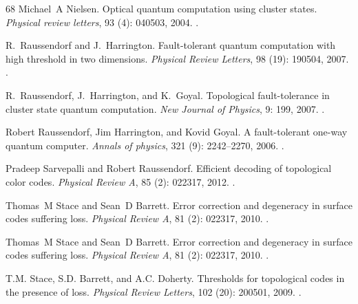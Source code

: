 \documentclass[a4paper, 10pt, accepted=2021-11-03]{quantumarticle}
\begin{document}
{\begin{thebibliography}{68}
Michael~A Nielsen.
\newblock Optical quantum computation using cluster states.
\newblock \emph{Physical review letters}, 93 (4): 040503,
  2004.
\newblock {}.

R.~Raussendorf and J.~Harrington.
\newblock Fault-tolerant quantum computation with high threshold in two
  dimensions.
\newblock \emph{Physical Review Letters}, 98 (19): 190504,
  2007.
\newblock {}.

R.~Raussendorf, J.~Harrington, and K.~Goyal.
\newblock Topological fault-tolerance in cluster state quantum computation.
\newblock \emph{New Journal of Physics}, 9: 199, 2007.
\newblock {}.

Robert Raussendorf, Jim Harrington, and Kovid Goyal.
\newblock A fault-tolerant one-way quantum computer.
\newblock \emph{Annals of physics}, 321 (9): 2242--2270,
  2006.
\newblock {}.

Pradeep Sarvepalli and Robert Raussendorf.
\newblock Efficient decoding of topological color codes.
\newblock \emph{Physical Review A}, 85 (2): 022317, 2012.
\newblock {}.

Thomas~M Stace and Sean~D Barrett.
\newblock Error correction and degeneracy in surface codes suffering loss.
\newblock \emph{Physical Review A}, 81 (2): 022317,
  2010{}.
\newblock {}.

Thomas~M Stace and Sean~D Barrett.
\newblock Error correction and degeneracy in surface codes suffering loss.
\newblock \emph{Physical Review A}, 81 (2): 022317,
  2010{}.
\newblock {}.

T.M. Stace, S.D. Barrett, and A.C. Doherty.
\newblock Thresholds for topological codes in the presence of loss.
\newblock \emph{Physical Review Letters}, 102 (20): 200501,
  2009.
\newblock {}.


\end{thebibliography}}
\end{document}
